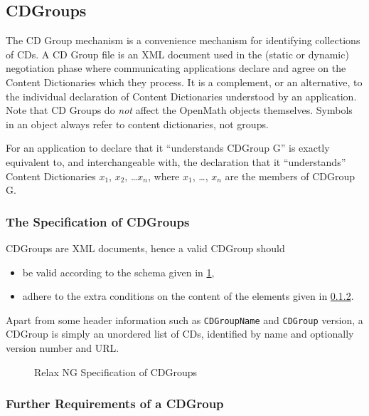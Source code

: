 \documentclass{report}
\def\textquote#1{``#1''}
\def\OM{OpenMath\xspace}
\def\XML{XML\xspace}
\begin{document}
\subsection{CDGroups}\label{ssec_cdgroups}

The CD Group mechanism is a convenience mechanism for identifying collections of CDs.  A
CD Group file is an \XML document used in the (static or dynamic) negotiation phase where
communicating applications declare and agree on the Content Dictionaries which they
process.  It is a complement, or an alternative, to the individual declaration of Content
Dictionaries understood by an application.  Note that CD Groups do \emph{not} affect the
\OM objects themselves.  Symbols in an object always refer to content dictionaries, not
groups.

For an application to declare that it \textquote{understands CDGroup G} is exactly
equivalent to, and interchangeable with, the declaration that it \textquote{understands}
Content Dictionaries $x_1$, $x_2$, \ldots $x_n$, where $x_1$, \ldots, $x_n$ are the
members of CDGroup G.

\subsubsection{The Specification of CDGroups}\label{sec_dtd_cdg}

CDGroups are \XML documents, hence  a valid  CDGroup
 should 
\begin{itemize}
\item be valid according to the schema given in \ref{fig_cdgroup.dtd},
\item adhere to the extra conditions on the content of the elements
  given in \ref{sect_cdgpcdata}.
\end{itemize}

Apart from some header information such as \lstinline|CDGroupName| and
\lstinline|CDGroup| version, a CDGroup is simply an unordered list of
CDs, identified by name and optionally version number and URL.

\begin{figure}\centering
  
  \caption{Relax NG Specification of CDGroups}\label{fig_cdgroup.dtd}
\end{figure}


\subsubsection{Further Requirements of a CDGroup}\label{sect_cdgpcdata}
\end{document}
